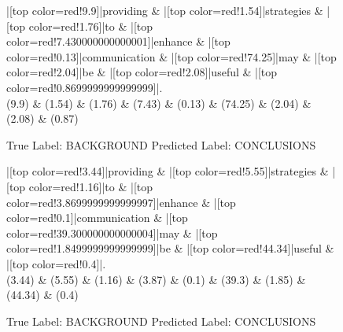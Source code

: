 \documentclass[a4paper, landscape]{article}
\begin{document}
\clearpage
\begin{figure}
\begin{center}
\begin{dependency}
\begin{deptext}
|[top color=red!9.9]|providing \& |[top color=red!1.54]|strategies \& |[top color=red!1.76]|to \& |[top color=red!7.430000000000001]|enhance \& |[top color=red!0.13]|communication \& |[top color=red!74.25]|may \& |[top color=red!2.04]|be \& |[top color=red!2.08]|useful \& |[top color=red!0.8699999999999999]|.\\
(9.9) \& (1.54) \& (1.76) \& (7.43) \& (0.13) \& (74.25) \& (2.04) \& (2.08) \& (0.87)\\
\end{deptext}
\end{dependency}
\end{center}
\caption{True Label: BACKGROUND Predicted Label: CONCLUSIONS}
\end{figure}
\clearpage
\begin{figure}
\begin{center}
\begin{dependency}
\begin{deptext}
|[top color=red!3.44]|providing \& |[top color=red!5.55]|strategies \& |[top color=red!1.16]|to \& |[top color=red!3.8699999999999997]|enhance \& |[top color=red!0.1]|communication \& |[top color=red!39.300000000000004]|may \& |[top color=red!1.8499999999999999]|be \& |[top color=red!44.34]|useful \& |[top color=red!0.4]|.\\
(3.44) \& (5.55) \& (1.16) \& (3.87) \& (0.1) \& (39.3) \& (1.85) \& (44.34) \& (0.4)\\
\end{deptext}
\end{dependency}
\end{center}
\caption{True Label: BACKGROUND Predicted Label: CONCLUSIONS}
\end{figure}
\clearpage
\end{document}

